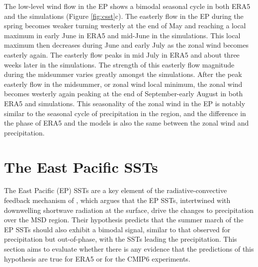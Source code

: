 The low-level wind flow in the EP shows a bimodal seasonal cycle in both ERA5 and the simulations (Figure \ref{fig:csst}c).
The easterly flow in the EP during the spring becomes weaker turning westerly at the end of May and reaching a local maximum in early June in ERA5 and mid-June in the simulations. This local maximum then decreases during June and early July as the zonal wind becomes easterly again. The easterly flow peaks in mid July in ERA5 and about three weeks later in the simulations. The strength of this easterly flow magnitude during the midsummer varies greatly amongst the simulations. 
After the peak easterly flow in  the midsummer, or zonal wind local minimum, the zonal wind becomes westerly again peaking at the end of September-early August in both ERA5 and simulations. 
This seasonality of the zonal wind in the EP is notably similar to the seasonal cycle of precipitation in the region, and the difference in the phase of ERA5 and the models is also the same between the zonal wind and precipitation.

\section{The East Pacific SSTs}

 The East Pacific (EP) SSTs are a key element of the radiative-convective feedback mechanism of \cite{magana1999}, which argues that the EP SSTs, intertwined with downwelling shortwave radiation at the surface, drive the changes to precipitation over the MSD region. Their hypothesis predicts that the summer march of the EP SSTs should also exhibit a bimodal signal, similar to that observed for precipitation but out-of-phase, with the SSTs leading the precipitation. This section aims to evaluate whether there is any evidence that the predictions of this hypothesis are true for ERA5 or for the CMIP6 experiments. 

